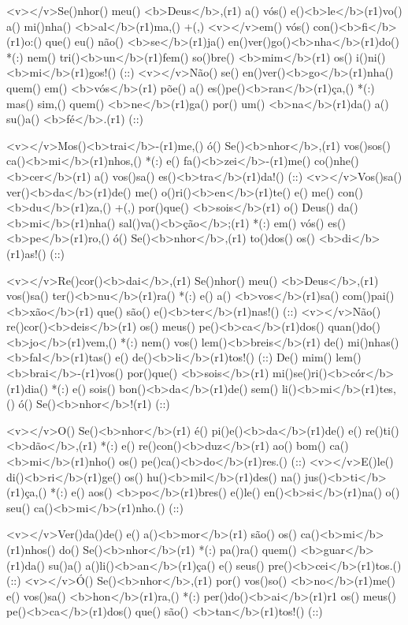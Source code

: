 <v></v>Se()nhor() meu() <b>Deus</b>,(r1) a() vós() e()<b>le</b>(r1)vo() a() mi()nha() <b>al</b>(r1)ma,() +(,) 
<v></v>em() vós() con()<b>fi</b>(r1)o:() que() eu() não() <b>se</b>(r1)ja() en()ver()go()<b>nha</b>(r1)do() *(:)
nem() tri()<b>un</b>(r1)fem() so()bre() <b>mim</b>(r1) os() i()ni()<b>mi</b>(r1)gos!() (::)
<v></v>Não() se() en()ver()<b>go</b>(r1)nha() quem() em() <b>vós</b>(r1) põe() a() es()pe()<b>ran</b>(r1)ça,() *(:)
mas() sim,() quem() <b>ne</b>(r1)ga() por() um() <b>na</b>(r1)da() a() su()a() <b>fé</b>.(r1) (::)

<v></v>Mos()<b>trai</b>-(r1)me,() ó() Se()<b>nhor</b>,(r1) vos()sos() ca()<b>mi</b>(r1)nhos,() *(:)
e() fa()<b>zei</b>-(r1)me() co()nhe()<b>cer</b>(r1) a() vos()sa() es()<b>tra</b>(r1)da!() (::)
<v></v>Vos()sa() ver()<b>da</b>(r1)de() me() o()ri()<b>en</b>(r1)te() e() me() con()<b>du</b>(r1)za,() +(,)
por()que() <b>sois</b>(r1) o() Deus() da() <b>mi</b>(r1)nha() sal()va()<b>ção</b>;(r1) *(:)
em() vós() es()<b>pe</b>(r1)ro,() ó() Se()<b>nhor</b>,(r1) to()dos() os() <b>di</b>(r1)as!() (::)

<v></v>Re()cor()<b>dai</b>,(r1) Se()nhor() meu() <b>Deus</b>,(r1) vos()sa() ter()<b>nu</b>(r1)ra() *(:)
e() a() <b>vos</b>(r1)sa() com()pai()<b>xão</b>(r1) que() são() e()<b>ter</b>(r1)nas!() (::)
<v></v>Não() re()cor()<b>deis</b>(r1) os() meus() pe()<b>ca</b>(r1)dos() quan()do() <b>jo</b>(r1)vem,() *(:)
nem() vos() lem()<b>breis</b>(r1) de() mi()nhas() <b>fal</b>(r1)tas() e() de()<b>li</b>(r1)tos!() (::)
De() mim() lem() <b>brai</b>-(r1)vos() por()que() <b>sois</b>(r1) mi()se()ri()<b>cór</b>(r1)dia() *(:)
e() sois() bon()<b>da</b>(r1)de() sem() li()<b>mi</b>(r1)tes,() ó() Se()<b>nhor</b>!(r1) (::)

<v></v>O() Se()<b>nhor</b>(r1) é() pi()e()<b>da</b>(r1)de() e() re()ti()<b>dão</b>,(r1) *(:)
e() re()con()<b>duz</b>(r1) ao() bom() ca()<b>mi</b>(r1)nho() os() pe()ca()<b>do</b>(r1)res.() (::)
<v></v>E()le() di()<b>ri</b>(r1)ge() os() hu()<b>mil</b>(r1)des() na() jus()<b>ti</b>(r1)ça,() *(:)
e() aos() <b>po</b>(r1)bres() e()le() en()<b>si</b>(r1)na() o() seu() ca()<b>mi</b>(r1)nho.() (::)

<v></v>Ver()da()de() e() a()<b>mor</b>(r1) são() os() ca()<b>mi</b>(r1)nhos() do() Se()<b>nhor</b>(r1) *(:)
pa()ra() quem() <b>guar</b>(r1)da() su()a() a()li()<b>an</b>(r1)ça() e() seus() pre()<b>cei</b>(r1)tos.() (::)
<v></v>Ó() Se()<b>nhor</b>,(r1) por() vos()so() <b>no</b>(r1)me() e() vos()sa() <b>hon</b>(r1)ra,() *(:)
per()do()<b>ai</b>(r1)r1 os() meus() pe()<b>ca</b>(r1)dos() que() são() <b>tan</b>(r1)tos!() (::)

